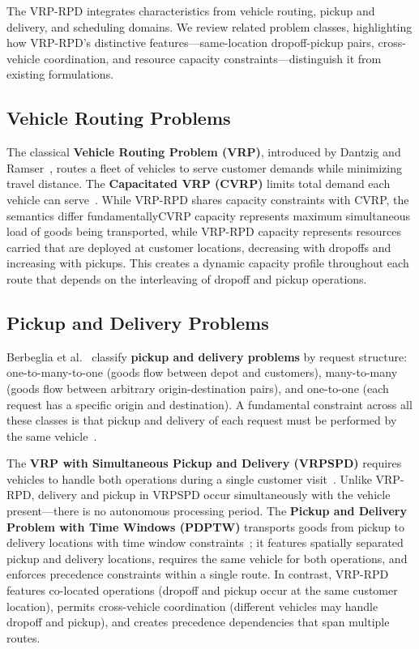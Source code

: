 \documentclass[sigconf]{acmart}
\begin{document}
The VRP-RPD integrates characteristics from vehicle routing, pickup and delivery, and scheduling domains. We review related problem classes, highlighting how VRP-RPD's distinctive features---same-location dropoff-pickup pairs, cross-vehicle coordination, and resource capacity constraints---distinguish it from existing formulations.

\subsection{Vehicle Routing Problems}

The classical \textbf{Vehicle Routing Problem (VRP)}, introduced by Dantzig and Ramser~\cite{dantzig1959truck}, routes a fleet of vehicles to serve customer demands while minimizing travel distance. The \textbf{Capacitated VRP (CVRP)} limits total demand each vehicle can serve~\cite{toth2014vehicle}. While VRP-RPD shares capacity constraints with CVRP, the semantics differ fundamentally\textemdash CVRP capacity represents maximum simultaneous load of goods being transported, while VRP-RPD capacity represents resources carried that are deployed at customer locations, decreasing with dropoffs and increasing with pickups. This creates a dynamic capacity profile throughout each route that depends on the interleaving of dropoff and pickup operations.

\subsection{Pickup and Delivery Problems}

Berbeglia et al.~\cite{berbeglia2007static} classify \textbf{pickup and delivery problems} by request structure: one-to-many-to-one (goods flow between depot and customers), many-to-many (goods flow between arbitrary origin-destination pairs), and one-to-one (each request has a specific origin and destination). A fundamental constraint across all these classes is that pickup and delivery of each request must be performed by the same vehicle~\cite{parragh2008survey2}.

The \textbf{VRP with Simultaneous Pickup and Delivery (VRPSPD)} requires vehicles to handle both operations during a single customer visit~\cite{dethloff2001vehicle, koc2020review}. Unlike VRP-RPD, delivery and pickup in VRPSPD occur simultaneously with the vehicle present---there is no autonomous processing period. The \textbf{Pickup and Delivery Problem with Time Windows (PDPTW)} transports goods from pickup to delivery locations with time window constraints~\cite{dumas1991pickup, ropke2006adaptive}; it features spatially separated pickup and delivery locations, requires the same vehicle for both operations, and enforces precedence constraints within a single route. In contrast, VRP-RPD features co-located operations (dropoff and pickup occur at the same customer location), permits cross-vehicle coordination (different vehicles may handle dropoff and pickup), and creates precedence dependencies that span multiple routes.
\end{document}
